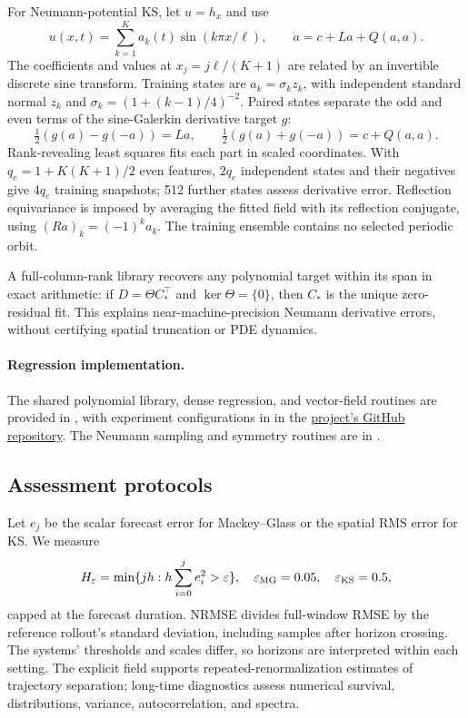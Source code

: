 \documentclass[11pt]{article}
\begin{document}
For Neumann-potential KS, let $u=h_x$ and use
\begin{equation}
 u(x,t)=\sum_{k=1}^{K}a_k(t)\sin(k\pi x/\ell),\qquad
 \dot a=c+La+Q(a,a).
 \label{eq:sine-coordinates}
\end{equation}
The coefficients and values at $x_j=j\ell/(K+1)$ are related by an invertible
discrete sine transform. Training states are $a_k=\sigma_k z_k$, with independent
standard normal $z_k$ and $\sigma_k=(1+(k-1)/4)^{-2}$. Paired states separate the
odd and even terms of the sine-Galerkin derivative target $g$:
\begin{equation}
 \tfrac12(g(a)-g(-a))=La,\qquad
 \tfrac12(g(a)+g(-a))=c+Q(a,a).
\end{equation}
Rank-revealing least squares fits each part in scaled coordinates. With
$q_e=1+K(K+1)/2$ even features, $2q_e$ independent states and their negatives
give $4q_e$ training snapshots; 512 further states assess derivative error.
Reflection equivariance is imposed by averaging the fitted field with its
reflection conjugate, using $(Ra)_k=(-1)^k a_k$. The training ensemble contains
no selected periodic orbit.

A full-column-rank library recovers any polynomial target within its span in
exact arithmetic: if $D=\Theta C_*^\top$ and $\ker\Theta=\{0\}$, then $C_*$
is the unique zero-residual fit. This explains near-machine-precision Neumann
derivative errors, without certifying spatial truncation or PDE dynamics.

\paragraph{Regression implementation.}
The shared polynomial library, dense regression, and vector-field routines are
provided in , with experiment configurations in
 in the
\href{https://github.com/Aloh5/learned-dynamics-cap}{project's GitHub repository}.
The Neumann sampling and symmetry routines are in
.

\subsection{Assessment protocols}
\label{sec:protocols}
Let $e_j$ be the scalar forecast error for Mackey--Glass or the spatial RMS error
for KS. We measure
\begin{equation}
 H_\varepsilon=\min\{jh:h\sum_{i=0}^j e_i^2>\varepsilon\},
 \quad \varepsilon_{\rm MG}=0.05,\quad\varepsilon_{\rm KS}=0.5,
 \label{eq:horizon}
\end{equation}
capped at the forecast duration. NRMSE divides full-window RMSE
by the reference rollout's standard deviation, including samples after horizon
crossing. The systems' thresholds and scales differ, so horizons are interpreted
within each setting. The explicit field supports repeated-renormalization estimates of trajectory
separation; long-time diagnostics assess numerical survival, distributions,
variance, autocorrelation, and spectra.
\end{document}
